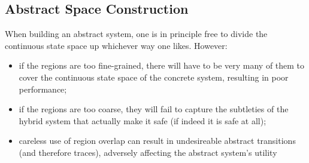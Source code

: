 \documentclass[runningheads]{llncs}
\begin{document}
{%



}

\subsection{Abstract Space Construction}
\label{abs.space.constr}

When building an abstract system, one is in principle free to divide the continuous state space up whichever way one likes. However:
\begin{itemize}
\item if the regions are too fine-grained, there will have to be very many of them to cover the continuous state space of the concrete system, resulting in poor performance;
\item if the regions are too coarse, they will fail to capture the subtleties of the hybrid system that actually make it safe (if indeed it is safe at all);
\item careless use of region overlap can result in undesireable abstract transitions (and therefore traces), adversely affecting the abstract system's utility 
\end{itemize}
\end{document}
